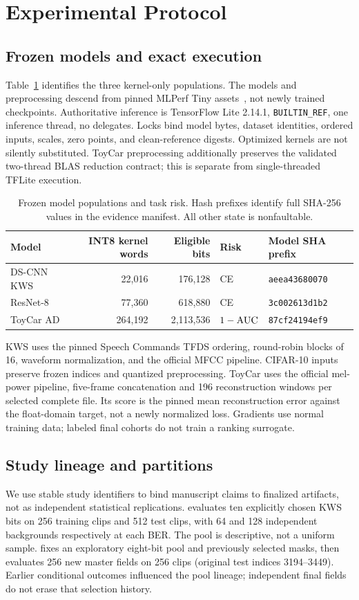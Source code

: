 \section{Experimental Protocol}\label{sec:experiments}
\subsection{Frozen models and exact execution}
Table~\ref{tab:models} identifies the three kernel-only populations. The models and preprocessing descend from pinned MLPerf Tiny assets~\cite{banbury2021mlperf,mlcommons2026tiny}, not newly trained checkpoints. Authoritative inference is TensorFlow Lite 2.14.1, \texttt{BUILTIN\_REF}, one inference thread, no delegates. Locks bind model bytes, dataset identities, ordered inputs, scales, zero points, and clean-reference digests. Optimized kernels are not silently substituted. ToyCar preprocessing additionally preserves the validated two-thread BLAS reduction contract; this is separate from single-threaded TFLite execution.
\begin{table}[t]
\caption{Frozen model populations and task risk. Hash prefixes identify full SHA-256 values in the evidence manifest. All other state is nonfaultable.}\label{tab:models}
\centering\small
\begin{tabular}{lrrll}\toprule
Model & INT8 kernel words & Eligible bits & Risk & Model SHA prefix\\\midrule
DS-CNN KWS &22,016&176,128&CE&\texttt{aeea43680070}\\
ResNet-8 &77,360&618,880&CE&\texttt{3c002613d1b2}\\
ToyCar AD &264,192&2,113,536&$1-\mathrm{AUC}$&\texttt{87cf24194ef9}\\\bottomrule
\end{tabular}
\end{table}

KWS uses the pinned Speech Commands TFDS ordering, round-robin blocks of 16, waveform normalization, and the official MFCC pipeline. CIFAR-10 inputs preserve frozen indices and quantized preprocessing. ToyCar uses the official mel-power pipeline, five-frame concatenation and 196 reconstruction windows per selected complete file. Its score is the pinned mean reconstruction error against the float-domain target, not a newly normalized loss. Gradients use normal training data; labeled final cohorts do not train a ranking surrogate.

\subsection{Study lineage and partitions}
We use stable study identifiers to bind manuscript claims to finalized artifacts, not as independent statistical replications.  evaluates ten explicitly chosen KWS bits on 256 training clips and 512 test clips, with 64 and 128 independent backgrounds respectively at each BER. The pool is descriptive, not a uniform sample.  fixes an exploratory eight-bit pool and previously selected masks, then evaluates 256 new master fields on 256 clips (original test indices 3194--3449). Earlier conditional outcomes influenced the pool lineage; independent final fields do not erase that selection history.

